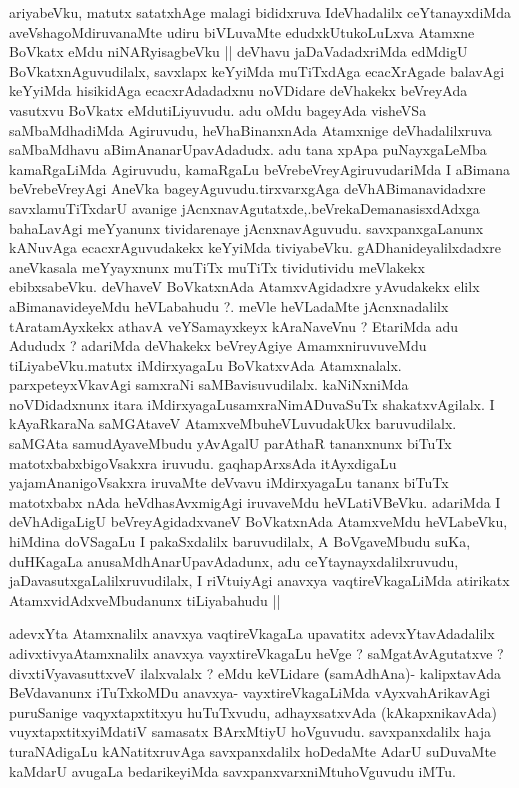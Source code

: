 \begin{artha}
ariyabeVku, matutx satatxhAge malagi bididxruva IdeVhadalilx
ceYtanayxdiMda aveVshagoMdiruvanaMte udiru biVLuvaMte
edudxkUtukoLuLxva Atamxne BoVkatx eMdu niNARyisagbeVku || deVhavu
jaDaVadadxriMda edMdigU BoVkatxnAguvudilalx, savxlapx keYyiMda
muTiTxdAga ecacXrAgade balavAgi keYyiMda hisikidAga ecacxrAdadadxnu
noVDidare deVhakekx beVreyAda vasutxvu BoVkatx eMdutiLiyuvudu. adu
oMdu bageyAda visheVSa saMbaMdhadiMda Agiruvudu, heVhaBinanxnAda
Atamxnige deVhadalilxruva saMbaMdhavu aBimAnanarUpavAdadudx. adu tana
xpApa puNayxgaLeMba kamaRgaLiMda Agiruvudu, kamaRgaLu
beVrebeVreyAgiruvudariMda I aBimana beVrebeVreyAgi AneVka
bageyAguvudu.tirxvarxgAga deVhABimanavidadxre savxlamuTiTxdarU avanige
jAcnxnavAgutatxde,.beVrekaDemanasisxdAdxga bahaLavAgi meYyanunx
tividarenaye jAcnxnavAguvudu. savxpanxgaLanunx kANuvAga
ecacxrAguvudakekx keYyiMda tiviyabeVku. gADhanideyalilxdadxre
aneVkasala meYyayxnunx muTiTx muTiTx tividutividu meVlakekx
ebibxsabeVku. deVhaveV BoVkatxnAda AtamxvAgidadxre yAvudakekx elilx
aBimanavideyeMdu heVLabahudu ?. meVle heVLadaMte jAcnxnadalilx
tAratamAyxkekx athavA veYSamayxkeyx kAraNaveVnu ? EtariMda adu Adududx
? adariMda deVhakekx beVreyAgiye AmamxniruvuveMdu tiLiyabeVku.matutx
iMdirxyagaLu BoVkatxvAda Atamxnalalx. parxpeteyxVkavAgi samxraNi
saMBavisuvudilalx. kaNiNxniMda noVDidadxnunx itara
iMdirxyagaLusamxraNimADuvaSuTx shakatxvAgilalx. I kAyaRkaraNa
saMGAtaveV AtamxveMbuheVLuvudakUkx baruvudilalx. saMGAta
samudAyaveMbudu yAvAgalU parAthaR tananxnunx biTuTx
matotxbabxbigoVsakxra iruvudu. gaqhapArxsAda itAyxdigaLu
yajamAnanigoVsakxra iruvaMte deVvavu iMdirxyagaLu tananx biTuTx
matotxbabx nAda heVdhasAvxmigAgi iruvaveMdu heVLatiVBeVku. adariMda I
deVhAdigaLigU beVreyAgidadxvaneV BoVkatxnAda AtamxveMdu heVLabeVku,
hiMdina doVSagaLu I pakaSxdalilx baruvudilalx, A BoVgaveMbudu suKa,
duHKagaLa anusaMdhAnarUpavAdadunx, adu ceYtaynayxdalilxruvudu,
jaDavasutxgaLalilxruvudilalx, I riVtuiyAgi anavxya vaqtireVkagaLiMda
atirikatx AtamxvidAdxveMbudanunx tiLiyabahudu ||
\end{artha}

\begin{artha}
adevxYta Atamxnalilx anavxya vaqtireVkagaLa upavatitx
adevxYtavAdadalilx adivxtivyaAtamxnalilx anavxya vayxtireVkagaLu heVge
? saMgatAvAgutatxve ? divxtiVyavasuttxveV ilalxvalalx ? eMdu keVLidare
\textbf(samAdhAna)- kalipxtavAda BeVdavanunx iTuTxkoMDu anavxya-
vayxtireVkagaLiMda vAyxvahArikavAgi puruSanige vaqyxtapxtitxyu
huTuTxvudu, adhayxsatxvAda (kAkapxnikavAda) vuyxtapxtitxyiMdatiV
samasatx BArxMtiyU hoVguvudu. savxpanxdalilx haja turaNAdigaLu
kANatitxruvAga savxpanxdalilx hoDedaMte AdarU suDuvaMte kaMdarU
avugaLa bedarikeyiMda savxpanxvarxniMtuhoVguvudu iMTu.
\end{artha}

